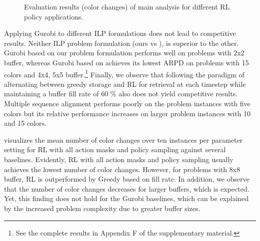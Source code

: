 \documentclass[11pt]{elsarticle}
\begin{document}
\begin{figure}[H]
\vspace{0.2cm}

\centering


        \caption{Evaluation results (color changes) of main analysis for different RL policy applications.}
        
        \label{fig:actionmasking_comparison_plots}
\end{figure}





Applying Gurobi to different ILP formulations does not lead to competitive results. Neither ILP problem formulation (ours vs \citet{wu2021mathematical}), is superior to the other. Gurobi based on our problem formulation performs well on problems with 2x2 buffer, whereas Gurobi based on \citet{wu2021mathematical} achieves its lowest ARPD on problems with 15 colors and 4x4, 5x5 buffer.\footnote{See the complete results in Appendix F of the supplementary material.} Finally, we observe that following the paradigm of alternating between greedy storage and RL for retrieval at each timestep while maintaining a buffer fill rate of 60 \% also does not yield competitive results. Multiple sequence alignment performs poorly on the problem instances with five colors but its relative performance increases on larger problem instances with 10 and 15 colors. 



 visualizes the mean number of color changes over ten instances per parameter setting for RL with all action masks and policy sampling against several baselines. Evidently, RL with all action masks and policy sampling usually achieves the lowest number of color changes. However, for problems with 8x8 buffer, RL is outperformed by Greedy based on fill rate. In addition, we observe that the number of color changes decreases for larger buffers, which is expected. Yet, this finding does not hold for the Gurobi baselines, which can be explained by the increased problem complexity due to greater buffer sizes.
\end{document}

